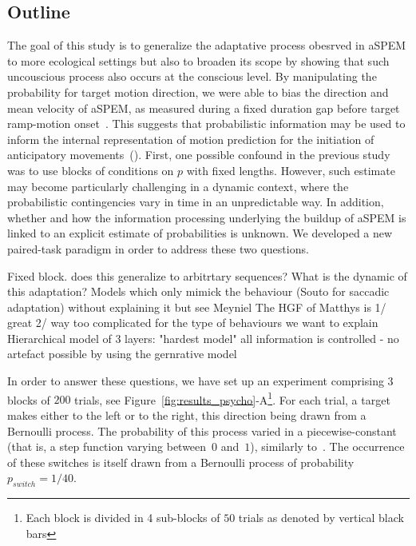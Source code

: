 \documentclass[profile,final,english, draft]{article}%
\newcommand{\citep}[1]{(\cite{#1})}
\begin{document}
\subsection{Outline}
The goal of this study is to generalize the adaptative process
obesrved in aSPEM to more ecological settings but
also to broaden its scope by showing that such uncouscious process
also occurs at the conscious level.
By manipulating the probability for target motion direction,
we were able to bias the direction and mean velocity of aSPEM,
as measured during a fixed duration gap
before target ramp-motion onset~.
This suggests that probabilistic information may be used
to inform the internal representation of motion prediction
for the initiation of anticipatory movements~\citep{Montagnini2010}.
First, one possible confound in the previous study was
to use blocks of conditions on $p$ with fixed lengths.
However, such estimate may become particularly
challenging in a dynamic context,
where the probabilistic contingencies vary in time in an unpredictable way.
In addition, whether and how the information processing underlying
the buildup of aSPEM is linked to
an explicit estimate of probabilities is unknown.
We developed a new paired-task paradigm in order
to address these two questions.


Fixed block. does this generalize to arbitrtary sequences?
What is the dynamic of this adaptation?
Models which only mimick the behaviour (Souto for saccadic adaptation)
without explaining it but see Meyniel
The HGF of Matthys is 1/ great 2/ way too complicated for
the type of behaviours we want to explain
Hierarchical model of 3 layers: "hardest model" all information is controlled - no artefact possible by using the gernrative model

In order to answer these questions, we have set up an experiment comprising $3$ blocks of $200$ trials, see Figure~\ref{fig:results_psycho}-A\footnote{Each block is divided in 4 sub-blocks of $50$ trials as denoted by vertical black bars}. For each trial, a target makes either to the left or to the right, this direction being drawn from a Bernoulli process. The probability of this process varied in a piecewise-constant (that is, a step function varying between~$0$ and~$1$), similarly to~\textcite{Meyniel13}. The occurrence of these switches is itself drawn from a Bernoulli process of probability $p_{switch}=1/40$.
\end{document}
